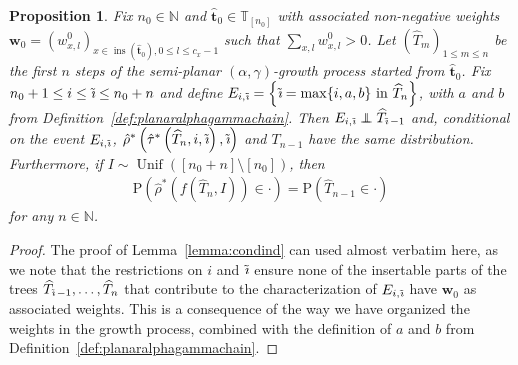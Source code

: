 \documentclass[a4paper, final]{amsart}
\theoremstyle{plain}
\newtheorem{prop}[thm]{Proposition}
\theoremstyle{definition}
\newcommand{\that}[1][t]{\hat{\boldsymbol{#1}}} %
\newcommand{\That}[1][T]{\widehat{#1}}
\newcommand{\T}{\mathbb{T}}
\DeclareMathOperator{\insertable}{ins}
\DeclareMathOperator{\tildei}{\tilde{\textit{\i}}}
\newcommand\independent{\protect\mathpalette{\protect\independenT}{\perp}}
\def\independenT#1#2{\mathrel{\rlap{$#1#2$}\mkern2mu{#1#2}}}
\renewcommand{\P}{\mathrm{P}}
\newcommand{\N}{\mathbb{N}}
\DeclareMathOperator{\Unif}{Unif}
\begin{document}
\begin{prop}
  Fix $n_0 \in \N$ and $\that_0 \in \T_{[n_0]}$ with associated non-negative weights $\mathbf{w}_0 = {\left( w_{x, l}^0 \right)}_{x \in \insertable (\that_0), 0 \leq l \leq c_x - 1}$ such that $\sum_{x, l} w_{x,l}^0 > 0$.
  Let ${\left( \That_m \right)}_{1 \leq m \leq n}$ be the first $n$ steps of the semi-planar $(\alpha, \gamma)$-growth process started from $\that_0$.
  Fix $n_0 + 1 \leq i \leq \tildei \leq n_0 + n$ and define $E_{i, \tildei} = \left\{ \tildei = \max \{i, a, b \} \ \text{in} \ \That_n \right\}$, with $a$ and $b$ from Definition~\ref{def:planaralphagammachain}.
  Then $E_{i, \tildei} \independent \That_{\tildei - 1}$ and, conditional on the event $E_{i, \tildei}$, $\hat{\rho}^* \left( \hat{\tau}^* \left( \That_n, i, \tildei \right), \tildei \right)$ and $T_{n-1}$ have the same distribution.
Furthermore, if $I \sim \Unif \left( [n_0 + n] \setminus [n_0] \right)$, then
  \begin{align}
    \P \left( \hat{\rho}^* \left( f\left( \That_n, I \right) \right) \in \cdot \right) = \P \left( \That_{n-1} \in \cdot \right)
    \label{eq:generalresult_downstep_downstepdistribution}
  \end{align}
  for any $n \in \N$.
  \label{prop:generalresult_downstep_stationary_lemma_theorem}
\end{prop}
%
\begin{proof}
  The proof of Lemma~\ref{lemma:condind} can used almost verbatim here, as we note that the restrictions on $i$ and $\tildei$ ensure none of the insertable parts of the trees $\That_{\tildei - 1}, \ldots, \That_n$ that contribute to the characterization of $E_{i, \tildei}$ have $\mathbf{w}_0$ as associated weights.
  This is a consequence of the way we have organized the weights in the growth process, combined with the definition of $a$ and $b$ from Definition~\ref{def:planaralphagammachain}.
\end{proof}
\end{document}
